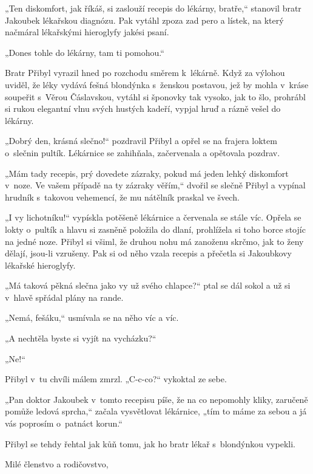 \documentclass[11pt]{article}
\begin{document}
„Ten diskomfort, jak říkáš, si zaslouží recepis do lékárny, bratře,“ stanovil bratr Jakoubek lékařskou diagnózu. Pak vytáhl zpoza zad pero a lístek, na který načmáral lékařskými hieroglyfy jakési psaní.

„Dones tohle do lékárny, tam ti pomohou.“

Bratr Přibyl vyrazil hned po rozchodu směrem k~lékárně. Když za výlohou uviděl, že léky vydává fešná blondýnka s~ženskou postavou, jež by mohla v~kráse soupeřit s~Věrou Čáslavskou, vytáhl si šponovky tak vysoko, jak to šlo, prohrábl si rukou elegantní vlnu svých hustých kadeří, vypjal hruď a rázně vešel do lékárny.

„Dobrý den, krásná slečno!“ pozdravil Přibyl a opřel se na frajera loktem o~slečnin pultík.
Lékárnice se zahihňala, začervenala a opětovala pozdrav.

„Mám tady recepis, prý dovedete zázraky, pokud má jeden lehký diskomfort v~noze. Ve vašem případě na ty zázraky věřím,“ dvořil se slečně Přibyl a vypínal hrudník s~takovou vehemencí, že mu nátělník praskal ve švech.

„I vy lichotníku!“ vypískla potěšeně lékárnice a červenala se stále víc. Opřela se lokty o~pultík a hlavu si zasněně položila do dlaní, prohlížela si toho borce stojíc na jedné noze. Přibyl si všiml, že druhou nohu má zanoženu skrčmo, jak to ženy dělají, jsou-li vzrušeny. Pak si od něho vzala recepis a přečetla si Jakoubkovy lékařské hieroglyfy.

„Má taková pěkná slečna jako vy už svého chlapce?“ ptal se dál sokol a už si v~hlavě spřádal plány na rande.

„Nemá, fešáku,“ usmívala se na něho víc a víc.

„A nechtěla byste si vyjít na vycházku?“

„Ne!“

Přibyl v~tu chvíli málem zmrzl. „C-c-co?“ vykoktal ze sebe.

„Pan doktor Jakoubek v~tomto recepisu píše, že na co nepomohly kliky, zaručeně pomůže ledová sprcha,“ začala vysvětlovat lékárnice, „tím to máme za sebou a já vás poprosím o~patnáct korun.“

Přibyl se tehdy řehtal jak kůň tomu, jak ho bratr lékař s~blondýnkou vypekli.

\signature{Josef Kubišta}

\vspace*{24pt}

Milé členstvo a rodičovstvo,
\end{document}
